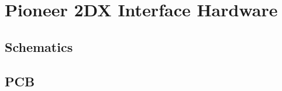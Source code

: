 \documentclass[../../monografia.tex]{subfiles}
\begin{document}
\chapter{Pioneer 2DX Interface Hardware}
\label{ap:Pioneer 2DX Interface Hardware}

\section{Schematics}









\section{PCB}
\end{document}
